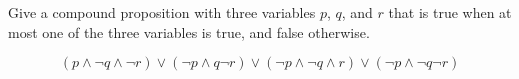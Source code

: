 \begin{questions}




\bonusquestion[2] Give a compound proposition with three variables $p$, $q$, and $r$ that is 
true when at most one of the three variables is true, and false otherwise.
    \begin{solution}
    \[ (p \wedge \neg q \wedge \neg r) \vee (\neg p \wedge q \neg r) 
        \vee (\neg p \wedge \neg q \wedge r) \vee (\neg p \wedge \neg q \neg r)\]
    \end{solution}





\end{questions}


